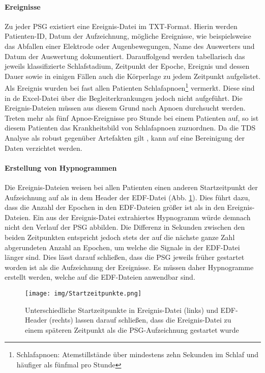 \paragraph{Ereignisse} Zu jeder \acs{PSG} existiert eine Ereignis-Datei im TXT-Format. Hierin werden Patienten-ID, Datum der Aufzeichnung, mögliche Ereignisse, wie beispielsweise das Abfallen einer Elektrode oder Augenbewegungen, Name des Auswerters und Datum der Auswertung dokumentiert. Darauffolgend werden tabellarisch das jeweils klassifizierte Schlafstadium, Zeitpunkt der Epoche, Ereignis und dessen Dauer sowie in einigen Fällen auch die Körperlage zu jedem Zeitpunkt aufgelistet. Als Ereignis wurden bei fast allen Patienten Schlafapnoen\footnote{Schlafapnoen: Atemstillstände über mindestens zehn Sekunden im Schlaf und häufiger als fünfmal pro Stunde} vermerkt. Diese sind in de Excel-Datei über die Begleiterkrankungen jedoch nicht aufgeführt. Die Ereignis-Dateien müssen aus diesem Grund nach Apnoen durchsucht werden. Treten mehr als fünf Apnoe-Ereignisse pro Stunde bei einem Patienten auf, so ist diesem Patienten das Krankheitsbild von Schlafapnoen zuzuordnen. 
Da die \acs{TDS} Analyse als robust gegenüber Artefakten gilt \parencite{breuer_netzwerktopologie_2016}, kann auf eine Bereinigung der Daten verzichtet werden.

\paragraph{Erstellung von Hypnogrammen} Die Ereignis-Dateien weisen bei allen Patienten einen anderen Startzeitpunkt der Aufzeichnung auf als in dem Header der \acs{EDF}-Datei (Abb. \ref{fig:zeitpunkte}). Dies führt dazu, dass die Anzahl der Epochen in den \acs{EDF}-Dateien größer ist als in den Ereignis-Dateien. Ein aus der Ereignis-Datei extrahiertes Hypnogramm würde demnach nicht den Verlauf der \acs{PSG} abbilden. Die Differenz in Sekunden zwischen den beiden Zeitpunkten entspricht jedoch stets der auf die nächste ganze Zahl abgerundeten Anzahl an Epochen, um welche die Signale in der \acs{EDF}-Datei länger sind. Dies lässt darauf schließen, dass die \acs{PSG} jeweils früher gestartet worden ist als die Aufzeichnung der Ereignisse. Es müssen daher Hypnogramme erstellt werden, welche auf die \acs{EDF}-Dateien anwendbar sind.

\begin{figure}[H]
	\centering
	\texttt{[image: img/Startzeitpunkte.png]}
	\caption[Startzeitpunkte von Ereignis- und \acs{EDF}-Datei]{Unterschiedliche Startzeitpunkte in Ereignis-Datei (links) und \acs{EDF}-Header (rechts) lassen darauf schließen, dass die Ereignis-Datei zu einem späteren Zeitpunkt als die \acs{PSG}-Aufzeichnung gestartet wurde}
	\label{fig:zeitpunkte}
\end{figure}

